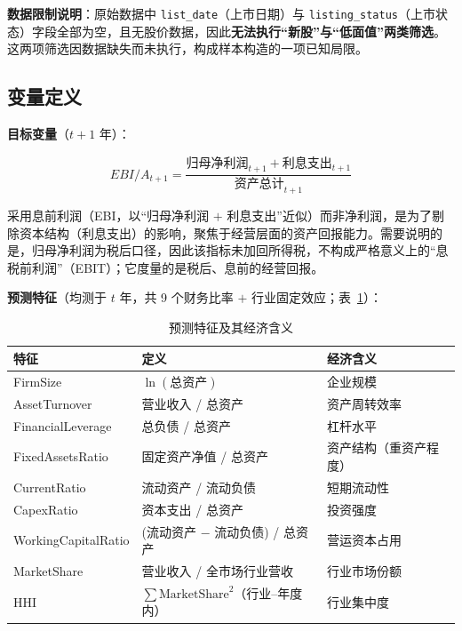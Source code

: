 \documentclass[11pt,a4paper]{ctexart}
\begin{document}
\textbf{数据限制说明}：原始数据中 \texttt{list\_date}（上市日期）与 \texttt{listing\_status}（上市状态）字段全部为空，且无股价数据，因此\textbf{无法执行“新股”与“低面值”两类筛选}。这两项筛选因数据缺失而未执行，构成样本构造的一项已知局限。

\subsection{变量定义}

\textbf{目标变量}（$t+1$ 年）：

\begin{equation}
EBI/A_{t+1} = \frac{\text{归母净利润}_{t+1} + \text{利息支出}_{t+1}}{\text{资产总计}_{t+1}}
\end{equation}

采用息前利润（EBI，以“归母净利润 $+$ 利息支出”近似）而非净利润，是为了剔除资本结构（利息支出）的影响，聚焦于经营层面的资产回报能力。需要说明的是，归母净利润为税后口径，因此该指标未加回所得税，不构成严格意义上的“息税前利润”（EBIT）；它度量的是税后、息前的经营回报。

\textbf{预测特征}（均测于 $t$ 年，共 9 个财务比率 $+$ 行业固定效应；表~\ref{tab:features}）：

\begin{table}[htbp]
\centering
\caption{预测特征及其经济含义}
\label{tab:features}
\begin{threeparttable}
\small
\begin{tabular}{lll}
\toprule
特征 & 定义 & 经济含义 \\
\midrule
FirmSize & $\ln(\text{总资产})$ & 企业规模 \\
AssetTurnover & 营业收入 / 总资产 & 资产周转效率 \\
FinancialLeverage & 总负债 / 总资产 & 杠杆水平 \\
FixedAssetsRatio & 固定资产净值 / 总资产 & 资产结构（重资产程度） \\
CurrentRatio & 流动资产 / 流动负债 & 短期流动性 \\
CapexRatio & 资本支出 / 总资产 & 投资强度 \\
WorkingCapitalRatio & (流动资产 $-$ 流动负债) / 总资产 & 营运资本占用 \\
MarketShare & 营业收入 / 全市场行业营收 & 行业市场份额 \\
HHI & $\sum \text{MarketShare}^2$（行业--年度内） & 行业集中度 \\
\bottomrule
\end{tabular}
\end{threeparttable}
\end{table}
\end{document}
